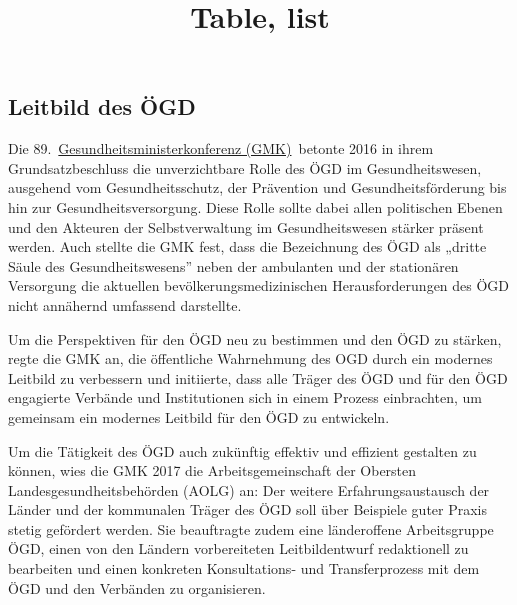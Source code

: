 \documentclass{article}
\begin{document}
\title{Table, list}

\maketitle





\subsection{Leitbild des ÖGD}\label{viv-id-https:003a:002f:002fconsortium:002egithub:002eio:002flt01:002fwebbuch:002fnew-netbuch:002exhtml:0023H8257368}



Die 89. \href{https://www.gmkonline.de/}{Gesundheitsministerkonferenz (GMK)} betonte 2016 in ihrem Grundsatzbeschluss die unverzichtbare Rolle des ÖGD im Gesundheitswesen, ausgehend vom Gesundheitsschutz, der Prävention und Gesundheitsförderung bis hin zur Gesundheitsversorgung. Diese Rolle sollte dabei allen politischen Ebenen und den Akteuren der Selbstverwaltung im Gesundheitswesen stärker präsent werden. Auch stellte die GMK fest, dass die Bezeichnung des ÖGD als „dritte Säule des Gesundheitswesens” neben der ambulanten und der stationären Versorgung die aktuellen bevölkerungsmedizinischen Herausforderungen des ÖGD nicht annähernd umfassend darstellte.


Um die Perspektiven für den ÖGD neu zu bestimmen und den ÖGD zu stärken, regte die GMK an, die öffentliche Wahrnehmung des OGD durch ein modernes Leitbild zu verbessern und initiierte, dass alle Träger des ÖGD und für den ÖGD engagierte Verbände und Institutionen sich in einem Prozess einbrachten, um gemeinsam ein modernes Leitbild für den ÖGD zu entwickeln.


Um die Tätigkeit des ÖGD auch zukünftig effektiv und effizient gestalten zu können, wies die GMK 2017 die Arbeitsgemeinschaft der Obersten Landesgesundheitsbehörden (AOLG) an: Der weitere Erfahrungsaustausch der Länder und der kommunalen Träger des ÖGD soll über Beispiele guter Praxis stetig gefördert werden. Sie beauftragte zudem eine länderoffene Arbeitsgruppe ÖGD, einen von den Ländern vorbereiteten Leitbildentwurf redaktionell zu bearbeiten und einen konkreten Konsultations- und Transferprozess mit dem ÖGD und den Verbänden zu organisieren.
\end{document}
